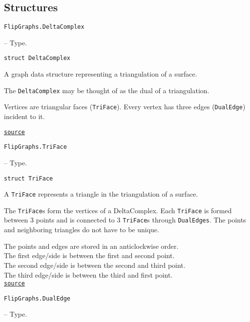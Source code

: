 \subsection{Structures}



\label{15035490444877811912}{}

\hypertarget{1315454663023603173}{\texttt{FlipGraphs.DeltaComplex}}  -- {Type.}

\begin{adjustwidth}{2em}{0pt}


\begin{verbatim}
struct DeltaComplex
\end{verbatim}

A graph data structure representing a triangulation of a surface.

The \texttt{DeltaComplex} may be thought of as the dual of a triangulation.

Vertices are triangular faces (\texttt{TriFace}). Every vertex has three edges (\texttt{DualEdge}) incident to it.



\href{https://github.com/schto223/FlipGraphs.jl/blob/490c01a7adf74b42f27dda05099165c47ae8133e/src/deltaComplex.jl#L47-L55}{\texttt{source}}


\end{adjustwidth}
\hypertarget{724782505096909684}{\texttt{FlipGraphs.TriFace}}  -- {Type.}

\begin{adjustwidth}{2em}{0pt}


\begin{verbatim}
struct TriFace
\end{verbatim}

A \texttt{TriFace} represents a triangle in the triangulation of a surface. 

The \texttt{TriFace}s form the vertices of a DeltaComplex. Each \texttt{TriFace} is formed between 3 points and is connected to 3 \texttt{TriFace}s through \texttt{DualEdges}. The points and neighboring triangles do not have to be unique.

The points and edges are stored in an anticlockwise order.\\
The first edge/side is between the first and second point.\\
The second edge/side is between the second and third point.\\
The third edge/side is between the third and first point.\\




\href{https://github.com/schto223/FlipGraphs.jl/blob/490c01a7adf74b42f27dda05099165c47ae8133e/src/deltaComplex.jl#L24-L37}{\texttt{source}}


\end{adjustwidth}
\hypertarget{10259513458807449042}{\texttt{FlipGraphs.DualEdge}}  -- {Type.}

